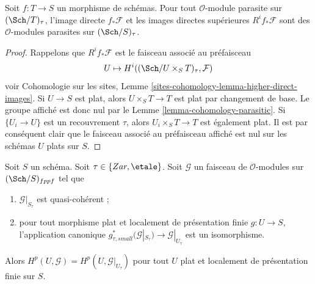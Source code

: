 \begin{lemma}
\label{lemma-direct-image-parasitic}
Soit $f : T \to S$ un morphisme de schémas. Pour tout
$\mathcal{O}$-module parasite sur $(\Sch/T)_\tau$, l'image directe
$f_*\mathcal{F}$ et les images directes supérieures $R^if_*\mathcal{F}$
sont des $\mathcal{O}$-modules parasites sur $(\Sch/S)_\tau$.
\end{lemma}

\begin{proof}
Rappelons que $R^if_*\mathcal{F}$ est le faisceau associé au préfaisceau
$$
U \mapsto H^i((\Sch/U \times_S T)_\tau, \mathcal{F})
$$
voir Cohomologie sur les sites, Lemme
\ref{sites-cohomology-lemma-higher-direct-images}.
Si $U \to S$ est plat, alors $U \times_S T \to T$ est plat par changement de
base. Le groupe affiché est donc nul par le
Lemme \ref{lemma-cohomology-parasitic}. Si $\{U_i \to U\}$ est un
recouvrement $\tau$, alors $U_i \times_S T \to T$ est également plat.
Il est par conséquent clair que le faisceau associé au préfaisceau affiché
est nul sur les schémas $U$ plats sur $S$.
\end{proof}

\begin{lemma}
\label{lemma-quasi-coherent-and-flat-base-change}
Soit $S$ un schéma. Soit $\tau \in \{Zar, \etale\}$.
Soit $\mathcal{G}$ un faisceau de $\mathcal{O}$-modules sur
$(\Sch/S)_{fppf}$ tel que
\begin{enumerate}
\item $\mathcal{G}|_{S_\tau}$ est quasi-cohérent ;
\item pour tout morphisme plat et localement de présentation finie
$g : U \to S$, l'application canonique
$g_{\tau, small}^*(\mathcal{G}|_{S_\tau}) \to \mathcal{G}|_{U_\tau}$
est un isomorphisme.
\end{enumerate}
Alors $H^p(U, \mathcal{G}) = H^p(U, \mathcal{G}|_{U_\tau})$ pour tout $U$
plat et localement de présentation finie sur $S$.
\end{lemma}

